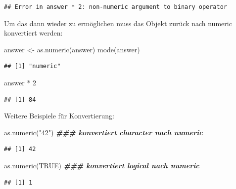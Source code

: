 \documentclass[
]{book}
\newenvironment{Shaded}{\begin{snugshade}}{\end{snugshade}}
\newcommand{\ConstantTok}[1]{\textcolor[rgb]{0.00,0.00,0.00}{#1}}
\newcommand{\DecValTok}[1]{\textcolor[rgb]{0.00,0.00,0.81}{#1}}
\newcommand{\DocumentationTok}[1]{\textcolor[rgb]{0.56,0.35,0.01}{\textbf{\textit{#1}}}}
\newcommand{\FunctionTok}[1]{\textcolor[rgb]{0.00,0.00,0.00}{#1}}
\newcommand{\NormalTok}[1]{#1}
\newcommand{\OtherTok}[1]{\textcolor[rgb]{0.56,0.35,0.01}{#1}}
\newcommand{\SpecialCharTok}[1]{\textcolor[rgb]{0.00,0.00,0.00}{#1}}
\newcommand{\StringTok}[1]{\textcolor[rgb]{0.31,0.60,0.02}{#1}}
\begin{document}
\begin{verbatim}
## Error in answer * 2: non-numeric argument to binary operator
\end{verbatim}

Um das dann wieder zu ermöglichen muss das Objekt zurück nach numeric konvertiert werden:

\begin{Shaded}
\begin{Highlighting}[]
\NormalTok{answer }\OtherTok{\textless{}{-}} \FunctionTok{as.numeric}\NormalTok{(answer)}
\FunctionTok{mode}\NormalTok{(answer)}
\end{Highlighting}
\end{Shaded}

\begin{verbatim}
## [1] "numeric"
\end{verbatim}

\begin{Shaded}
\begin{Highlighting}[]
\NormalTok{answer }\SpecialCharTok{*} \DecValTok{2}
\end{Highlighting}
\end{Shaded}

\begin{verbatim}
## [1] 84
\end{verbatim}

Weitere Beispiele für Konvertierung:

\begin{Shaded}
\begin{Highlighting}[]
\FunctionTok{as.numeric}\NormalTok{(}\StringTok{"42"}\NormalTok{) }\DocumentationTok{\#\#\# konvertiert character nach numeric}
\end{Highlighting}
\end{Shaded}

\begin{verbatim}
## [1] 42
\end{verbatim}

\begin{Shaded}
\begin{Highlighting}[]
\FunctionTok{as.numeric}\NormalTok{(}\ConstantTok{TRUE}\NormalTok{) }\DocumentationTok{\#\#\# konvertiert logical nach numeric}
\end{Highlighting}
\end{Shaded}

\begin{verbatim}
## [1] 1
\end{verbatim}
\end{document}
